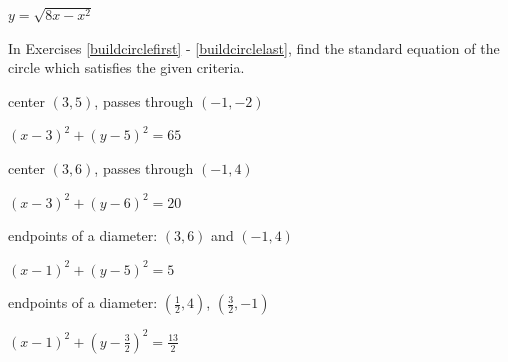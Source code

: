 \documentclass{ximera}
\begin{document}
\begin{question}
\begin{problem}

\begin{solution}
$y = \sqrt{8x-x^2}$
\end{solution}
\end{problem}
\end{question}

\begin{question}
In Exercises \ref{buildcirclefirst} - \ref{buildcirclelast}, find the standard equation of the circle which satisfies the given criteria.   

\begin{problem}\label{buildcirclefirst}
center $(3, 5)$,  passes through $(-1, -2)$ 

\begin{solution}
    $(x - 3)^{2} + (y - 5)^{2} = 65$
\end{solution}
\end{problem}

\begin{problem}
center $(3, 6)$,  passes through  $(-1, 4)$

\begin{solution}
    $(x-3)^2+(y-6)^2 = 20$
\end{solution}
\end{problem}  

\begin{problem}
endpoints of a diameter: $(3,6)$ and $(-1,4)$

\begin{solution}
    $(x-1)^2 + (y-5)^2 = 5$
\end{solution}
\end{problem} 

\begin{problem}\label{buildcirclelast}
endpoints of a diameter:  $\left( \frac{1}{2}, 4\right)$, $\left(\frac{3}{2}, -1\right)$ 
\end{problem}

\begin{solution}
    $(x-1)^2 + \left(y - \frac{3}{2}\right)^2 = \frac{13}{2}$
\end{solution}
\end{question}
\end{document}
